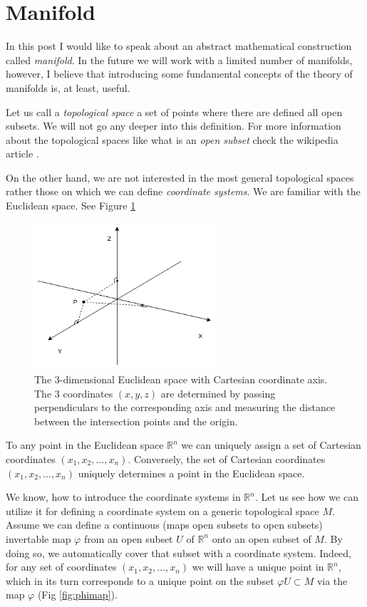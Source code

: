 \documentclass[a4paper,10pt]{article}
\title{}
\author{}
\begin{document}
\section{Manifold}

In this post I would like to speak about an abstract mathematical construction called {\it manifold}. In the future we will work with a limited number of manifolds, however, I believe that introducing some fundamental concepts of the theory of manifolds is, at least, useful. 

Let us call a {\it topological space } a set of points where there are defined all open subsets. We will not go any deeper into this definition. For more information about the topological spaces like what is an {\it open subset} check the wikipedia article \cite{topspace}. 

On the other hand, we are not interested in the most general topological spaces rather those on which we can define {\it coordinate systems}. We are familiar with the Euclidean space. See Figure \ref{fig:3dcart}

\begin{figure}[h]
\centering
 \includegraphics[width=0.6\textwidth]{../../images/3DEuclidean.png}
 \caption{The 3-dimensional Euclidean space with Cartesian coordinate axis. The 3 coordinates $(x,y,z)$ are determined by passing perpendiculars to the corresponding axis and measuring the distance between the intersection points and the origin. }
 \label{fig:3dcart}
\end{figure}
 
To any point in the Euclidean space $\mathbb{R}^n$  we can uniquely assign a set of Cartesian coordinates $(x_1, x_2,\ldots, x_n)$. Conversely, the set of Cartesian coordinates $(x_1, x_2,\ldots, x_n)$ uniquely determines a point in the Euclidean space. 

We know, how to introduce the coordinate systems in $\mathbb{R}^n$. Let us see how we can utilize it for defining a coordinate system on a generic topological space $M$. Assume we can define a continuous (maps open subsets to open subsets) invertable map $\varphi$ from an open subset $U$ of $\mathbb{R}^n$ onto an open subset of $M$. By doing so, we automatically cover that subset with a coordinate system. Indeed, for any set of coordinates $(x_1, x_2,\ldots, x_n)$ we will have a unique point in $\mathbb{R}^n$, which in its turn corresponds to a unique point on the subset $\varphi U \subset M$ via the map $\varphi$ (Fig \ref{fig:phimap}). 
\end{document}
